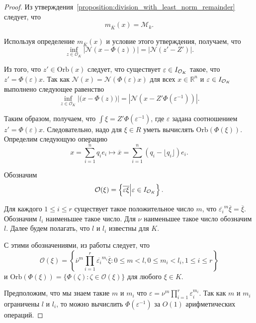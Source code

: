 \documentclass[_00_dissertation.tex]{subfiles}
\begin{document}
\begin{proof}
    Из утверждения~\ref{proposition:division_with_least_norm_remainder} следует, что
    \begin{equation*}
        m_{\overline{K}}(x) = \mathcal{M}_k.
    \end{equation*}
    
    Используя определение $m_{\overline{K}}(x)$ и условие этого утверждения, получаем, что
    \begin{equation*}
        \inf\limits_{z \in \mathcal{O}_K} |\mathcal{N}(x - \Phi(z))| = |\mathcal{N}(z' - Z')|.
    \end{equation*}

    Из того, что $z' \in \textrm{Orb}(x)$ следует, что существует $\varepsilon \in I_{\mathcal{O}_K}$ такое, что $z' = \Phi(\varepsilon)x$.
    Так как $\mathcal{N}(x) = \mathcal{N}(\Phi(\varepsilon)x)$ для всех $x \in \mathbb{R}^n$ и $\varepsilon \in I_{\mathcal{O}_K}$ выполнено следующее равенство
    \begin{equation*}
        \inf\limits_{z \in \mathcal{O}_K} |\mathcal(x - \Phi(z))| = |\mathcal{N}(x - Z'\Phi(\varepsilon^{-1}))|.
    \end{equation*}

    Таким образом, получаем, что $\int{\xi} = Z'\Phi(\varepsilon^{-1})$, где $\varepsilon$ задана соотношением $z' = \Phi(\varepsilon)x$.
    Следовательно, надо для $\xi \in R$ уметь вычислять $\textrm{Orb}(\Phi(\xi))$.
    Определим следующую операцию
    \begin{equation*}
        x = \sum\limits_{i=1}^n q_i e_i \longmapsto \overline{x} = \sum\limits_{i=1}^n (q_i - \lfloor q_i \rfloor)e_i.
    \end{equation*}
    
    Обозначим
    \begin{equation*}
        \mathcal{O}(\xi) = \left\{
            \overline{\varepsilon\xi} \Big| \varepsilon \in I_{\mathcal{O}_K}
    	\right\}.
    \end{equation*}
    
    Для каждого $1 \le i \le r$ существует такое положительное число $m$, что $\overline{\varepsilon_i}^m\overline{\xi} = \overline{\xi}$.
    Обозначим $l_i$ наименьшее такое число.
    Для $\nu$ наименьшее такое число обозначим $l$.
    Далее будем полагать, что $l$ и $l_i$ известны для $K$.
    
    С этими обозначениями, из работы \cite{source:Lezowski} следует, что
    \begin{equation*}
        \mathcal{O}(\xi) = \left\{
            \overline{\nu}^m \prod\limits_{i=1}^r \overline{\varepsilon_i}^{m_i} \overline{\xi}:
                0 \le m < l, 0 \le m_i < l_i, 1 \le i \le r
        \right\}
    \end{equation*}
    и $\textrm{Orb}(\Phi(\xi)) = \{\Phi(\zeta):\zeta \in \mathcal{O}(\xi)\}$ для любого $\xi\in K$.

    Предположим, что мы знаем такие $m$ и $m_i$ что $\varepsilon = \nu^m\prod_{i=1}^r \varepsilon_i^{m_i}$.
    Так как $m$ и $m_i$ ограничены $l$ и $l_i$, то можно вычислить $\Phi(\varepsilon^{-1})$ за $O(1)$ арифметических операций.
\end{proof}
\end{document}
